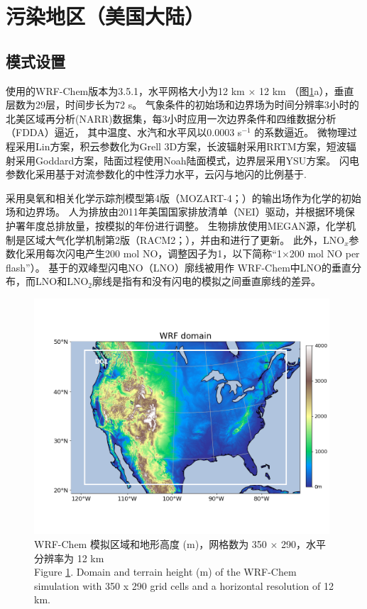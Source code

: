 \section{污染地区（美国大陆）} \label{sec:us}

\subsection{模式设置} \label{sec:model_settings_us}

使用的WRF-Chem版本为3.5.1，水平网格大小为12 km $\times$ 12 km （图\ref{fig:us_domain}a），垂直层数为29层，时间步长为72 s。
气象条件的初始场和边界场为时间分辨率3小时的北美区域再分析(NARR)数据集，每3小时应用一次边界条件和四维数据分析（FDDA）逼近，
其中温度、水汽和水平风以0.0003 s$^{-1}$ 的系数逼近\citep{Laughner.2017}。
微物理过程采用Lin方案\citep{Lin.1983}，积云参数化为Grell 3D方案\citep{Grell.1993a,Grell.2002a}，长波辐射采用RRTM方案\citep{Iacono.2008}，短波辐射采用Goddard方案，陆面过程使用Noah陆面模式\citep{Koren.1999}，边界层采用YSU方案\citep{Hong.2006}。
闪电参数化采用基于对流参数化的中性浮力水平\citep{Pickering.1992}，云闪与地闪的比例基于\citet{Boccippio.2001}.

采用臭氧和相关化学示踪剂模型第4版（MOZART-4；\citet{Emmons.2010}）的输出场作为化学的初始场和边界场。
人为排放由2011年美国国家排放清单（NEI）驱动，并根据环境保护署年度总排放量，按模拟的年份进行调整\citep{EPA.2015}。
生物排放使用MEGAN源，化学机制是区域大气化学机制第2版（RACM2；\citet{Goliff.2013}），并由\citet{Browne.2014}和\citet{Schwantes.2015}进行了更新。
此外，LNO$_x$参数化采用每次闪电产生200 mol NO，调整因子为1，以下简称“1$\times$200 mol NO per flash”）。
基于\citet{Ott.2010}的双峰型闪电NO（LNO）廓线\citep{Laughner.2017}被用作 WRF-Chem中LNO的垂直分布，而LNO和LNO$_2$廓线是指有和没有闪电的模拟之间垂直廓线的差异。


\begin{figure}[!htbp]
\centering
\includegraphics[width=11cm]{./figures/us_domain.png}
\caption{WRF-Chem 模拟区域和地形高度 (m)，网格数为 350 $\times$ 290，水平分辨率为 12 km \\
Figure \ref{fig:us_domain}. Domain and terrain height (m) of the WRF-Chem simulation with 350 x 290 grid cells and a horizontal resolution of 12 km.}
\label{fig:us_domain}
\end{figure}




